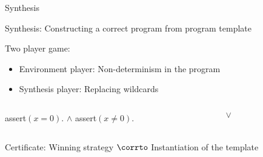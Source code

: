 \documentclass[../talk.tex]{subfiles}
\begin{document}
\begin{frame}{Synthesis}
    \begin{overlayarea}{\slidewidth}{\slideheight}

            \alert{Synthesis:} Constructing a correct program from \alert{program template}

        \vspace*{1em}


            \alert{Two player game:}
            \begin{itemize}
                \item[] Environment player: Non-determinism in the program
                \item[] Synthesis player: Replacing wildcards
            \end{itemize}

        \begin{center}
            \begin{columns}[T]
                \begin{column}{0.35\textwidth}

                        \noindent

                        \vspace*{1em}


                            assert$(x = 0)$. $\wedge$ assert$(x \neq 0)$.

                \end{column}
                \begin{column}{0.3\textwidth}
                        \noindent

                        \vspace*{1em}


                             $\vee$\\ 
                \end{column}
            \end{columns}
        \end{center}

        \vspace*{1em}

            \vspace*{-1em}
            Certificate: \alert{Winning strategy} $\corrto$ Instantiation of the template

    \end{overlayarea}
\end{frame}
\end{document}
